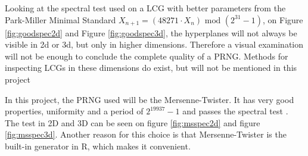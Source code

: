 \noindent Looking at the spectral test used on a LCG with better parameters from the Park-Miller Minimal Standard\:  $X_{n+1}=(48271\cdot X_{n}) \text{ mod } (2^{31}-1)$\cite{knuth}, on Figure \ref{fig:goodspec2d} and Figure \ref{fig:goodspec3d}, the hyperplanes will not always be visible in 2d or 3d, but only in higher dimensions. Therefore a visual examination will not be enough to conclude the complete quality of a PRNG. Methods for inspecting LCGs in these dimensions do exist, but will not be mentioned in this project
\newline

\noindent In this project, the PRNG used will be the Mersenne-Twister. It has very good properties, uniformity and a period of $2^{19937}-1$ and passes the spectral test \cite{mersenne}. The test in 2D and 3D can be seen on figure \ref{fig:msspec2d} and figure \ref{fig:msspec3d}. Another reason for this choice is that Mersenne-Twister is the built-in generator in R, which makes it convenient. 


